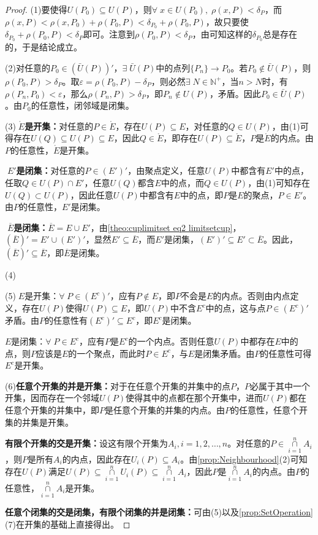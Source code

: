 \begin{proof}
	(1)要使得$U(P_0)\subseteq U(P)$，则$\forall\;x\in U(P_0),\;\rho(x,P)<\delta_P$，而$\rho(x,P)<\rho(x,P_0)+\rho(P_0,P)<\delta_{P_0}+\rho(P_0,P)$，故只要使$\delta_{P_0}+\rho(P_0,P)<\delta_P$即可。注意到$\rho(P_0,P)<\delta_P$，由可知这样的$\delta_{P_0}$总是存在的，于是结论成立。 \par
	(2)对任意的$P_0\in\left(\bar{U}(P)\right)'$，$\exists\;\bar{U}(P)$中的点列$\{P_n\}\to P_0$。若$P_0\notin \bar{U}(P)$，则$\rho(P_0,P)>\delta_P$。取$\varepsilon=\rho(P_0,P)-\delta_P$，则必然$\exists\;N\in\mathbb{N}^+$，当$n>N$时，有$\rho(P_n,P_0)<\varepsilon$，那么$\rho(P_n,P)>\delta_P$，即$P_n\notin U(P)$，矛盾。因此$P_0\in \bar{U}(P)$。由$P_0$的任意性，闭邻域是闭集。\par
	(3)\textbf{$\;\mathring{E}$是开集：}对任意的$P\in\mathring{E}$，存在$U(P)\subseteq E$，对任意的$Q\in U(P)$，由(1)可得存在$U(Q)\subseteq U(P)\subseteq E$，因此$Q\in\mathring{E}$，即存在$U(P)\subseteq\mathring{E}$，$P$是$\mathring{E}$的内点。由$P$的任意性，$\mathring{E}$是开集。\par
	\textbf{$\;E'$是闭集：}对任意的$P\in (E')'$，由聚点定义，任意$U(P)$中都含有$E'$中的点，任取$Q\in U(P)\cap E'$，任意$U(Q)$都含$E$中的点，而$Q\in U(P)$，由(1)可知存在$U(Q)\subset U(P)$，因此任意$U(P)$中都含有$E$中的点，即$P$是$E$的聚点，$P\in E'$。由$P$的任意性，$E'$是闭集。\par
	\textbf{$\;\overline{E}$是闭集：}$\overline{E}=E\cup E'$，由\cref{theo:cuplimitset eq2 limitsetcup}，$(\overline{E})'=E'\cup (E')'$，显然$E'\subseteq \overline{E}$，而$E'$是闭集，$(E')'\subseteq E'\subset\overline{E}$。因此，$(\overline{E})'\subseteq\overline{E}$，即$\overline{E}$是闭集。\par
	(4)\par
	(5)$\;E$是开集：$\forall\; P\in (E^c)'$，应有$P\notin E$，即$P$不会是$E$的内点。否则由内点定义，存在$U(P)$使得$U(P)\subseteq E$，即$U(P)$中不含$E^c$中的点，这与点$P\in (E^c)'$矛盾。由$P$的任意性有$(E^c)'\subseteq E^c$，即$E^c$是闭集。\par
	$E$是闭集：$\forall\; P\in E^c$，应有$P$是$E^c$的一个内点。否则任意$U(P)$中都存在$E$中的点，则$P$应该是$E$的一个聚点，而此时$P\in E^c$，与$E$是闭集矛盾。由$P$的任意性可得$E^c$是开集。\par
	(6)\textbf{任意个开集的并是开集：}对于在任意个开集的并集中的点$P$，$P$必属于其中一个开集，因而存在一个邻域$U(P)$使得其中的点都在那个开集中，进而$U(P)$都在任意个开集的并集中，即$P$是任意个开集的并集的内点。由$P$的任意性，任意个开集的并集是开集。\par
	\textbf{有限个开集的交是开集：}设这有限个开集为$A_i,i=1,2,\dots,n$。对任意的$ P\in\underset{i=1}{\overset{n}{\cap}}A_i$，则$P$是所有$A_i$的内点，因此存在$U_i(P)\subseteq A_i$。由\cref{prop:Neighbourhood}(2)可知存在$U(P)$满足$U(P)\subseteq\underset{i=1}{\overset{n}{\cap}}U_i(P)\subseteq\underset{i=1}{\overset{n}{\cap}}A_i$，因此$P$是$\underset{i=1}{\overset{n}{\cap}}A_i$的内点。由$P$的任意性，$\underset{i=1}{\overset{n}{\cap}}A_i$是开集。\par
	\textbf{任意个闭集的交是闭集，有限个闭集的并是闭集：}可由(5)以及\cref{prop:SetOperation}(7)在开集的基础上直接得出。
\end{proof}
